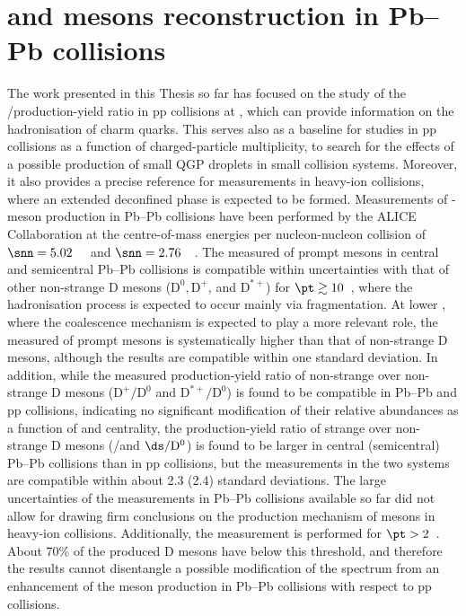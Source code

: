 \chapter{\texorpdfstring{\ds and \dpl mesons reconstruction in Pb--Pb collisions}{Ds+ and D+ mesons reconstruction in Pb--Pb collisions}}\label{ch:PbPb}
The work presented in this Thesis so far has focused on the study of the \ds/\dpl production-yield ratio in pp collisions at \thirteen, which can provide information on the hadronisation of charm quarks. This serves also as a baseline for studies in pp collisions as a function of charged-particle multiplicity, to search for the effects of a possible production of small QGP droplets in small collision systems. Moreover, it also provides a precise reference for measurements in heavy-ion collisions, where an extended deconfined phase is expected to be formed. Measurements of \ds-meson production in Pb--Pb collisions have been performed by the ALICE Collaboration at the centre-of-mass energies per nucleon-nucleon collision of $\snn=5.02$~\tev~\cite{ALICE:2021kfc,ALICE:2018lyv} and $\snn=2.76$~\tev~\cite{ALICE:2015dry}. The measured \raa of prompt \ds mesons in central and semicentral Pb--Pb collisions is compatible within uncertainties with that of other non-strange D mesons ($\mathrm{D^0, D^+}$, and $\mathrm{D^{*+}}$) for $\pt\gtrsim10$~\gevc, where the hadronisation process is expected to occur mainly via fragmentation. At lower \pt, where the coalescence mechanism is expected to play a more relevant role, the measured \raa of prompt \ds mesons is systematically higher than that of non-strange D mesons, although the results are compatible within one standard deviation. In addition, while the measured production-yield ratio of non-strange over non-strange D mesons ($\mathrm{D^+/D^0}$ and $\mathrm{D^{*+}/D^0}$) is found to be compatible in Pb--Pb and pp collisions, indicating no significant modification of their relative abundances as a function of \pt and centrality, the production-yield ratio of strange over non-strange D mesons (\ds/\dpl and $\ds/\mathrm{D^0}$) is found to be larger in central (semicentral) Pb--Pb collisions than in pp collisions, but the measurements in the two systems are compatible within about 2.3 (2.4) standard deviations. The large uncertainties of the measurements in Pb--Pb collisions available so far did not allow for drawing firm conclusions on the production mechanism of \ds mesons in heavy-ion collisions. Additionally, the measurement is performed for $\pt>2$~\gevc. About 70\% of the produced D mesons have \pt below this threshold, and therefore the results cannot disentangle a possible modification of the \pt spectrum from an enhancement of the \ds meson production in Pb--Pb collisions with respect to pp collisions.

